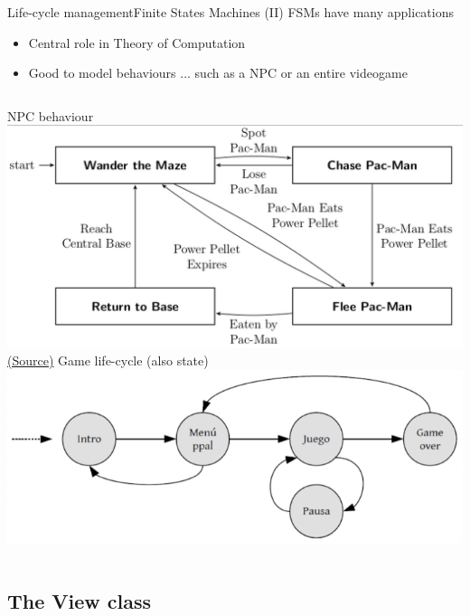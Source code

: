 \documentclass[10pt,compress]{beamer} %
\begin{document}
\begin{frame}{Life-cycle management}{Finite States Machines (II)}
	FSMs have many applications
	    \begin{itemize}
	    \item Central role in Theory of Computation
	    \item Good to model behaviours ... such as a NPC or an entire videogame
	    \end{itemize}

	\bigskip

	\begin{columns}
		\centering NPC behaviour\\
		\includegraphics[width=\linewidth]{figs/fsm-pacman.png}\\
		\centering \tiny \href{http://bits.citrusbyte.com/state-design-pattern-with-ruby/}{(Source)}
		\centering Game life-cycle (also state) \\
		\includegraphics[width=\linewidth]{figs/states}\\
	\end{columns}
\end{frame}


\subsection{The View class}
\end{document}

